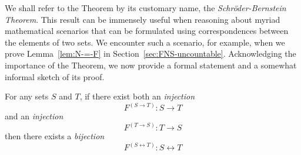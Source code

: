 We shall refer to the Theorem by its customary name, the {\it Schr\"{o}der-Bernstein Theorem}. This result can be immensely useful when reasoning about myriad mathematical scenarios that can be formulated using correspondences between the elements of two sets.  We encounter such a scenario, for example, when we prove Lemma~\ref{lem:N-=-F} in Section~\ref{sec:FNS-uncountable}.  Acknowledging the importance of the Theorem, we now provide a formal statement and a somewhat informal sketch of its proof.

\begin{theorem}
\label{thm.S-B}
For any sets $S$ and $T$, if there exist both an {\em injection}
\[ F^{(S \rightarrow T)}: S \rightarrow T \]
and an {\em injection}
\[ F^{(T \rightarrow S)}: T \rightarrow S \]
then there exists a {\em bijection}
\[ F^{(S \leftrightarrow T)}: S \leftrightarrow T \]
\end{theorem}

